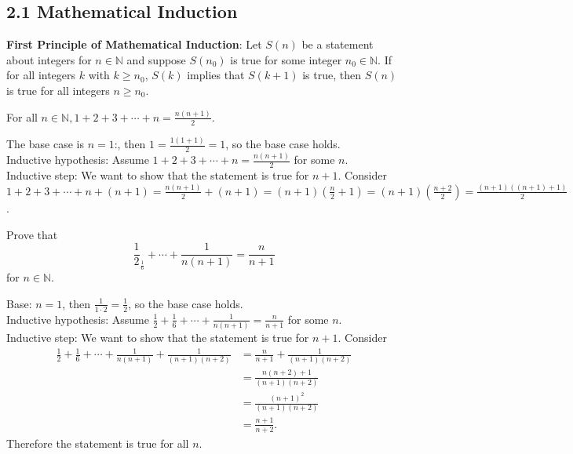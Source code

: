 \documentclass{article}
\newcommand{\N}{\mathbb{N}}
\begin{document}
\subsection{2.1 Mathematical Induction}
\begin{definition}
  \textbf{First Principle of Mathematical Induction}: Let $S(n)$ be a statement about integers for $n\in \N$ and suppose $S(n_0)$ is true for some integer $n_0\in\N$. If for all integers $k$ with $k\geq n_0$, $S(k)$ implies that $S(k+1)$ is true, then $S(n)$ is true for all integers $n\geq n_0$.
\end{definition}
\begin{example}
  For all $n\in\N,1+2+3+\cdots+n=\frac{n(n+1)}{2}$.

  The base case is $n=1$:, then $1=\frac{1(1+1)}{2}=1$, so the base case holds.\\
  Inductive hypothesis: Assume $1+2+3+\cdots+n=\frac{n(n+1)}{2}$ for some $n$.\\
  Inductive step: We want to show that the statement is true for $n+1$. Consider $1+2+3+\cdots+n+(n+1)=\frac{n(n+1)}{2}+(n+1)=(n+1)(\frac{n}{2}+1)=(n+1)(\frac{n+2}{2})=\frac{(n+1)((n+1)+1)}{2}$.
\end{example}
\begin{example}
  Prove that
  \[\frac{1}{2}_\frac{1}{6}+\cdots+\frac{1}{n(n+1)}=\frac{n}{n+1}\]
  for $n\in\N$.

  Base: $n=1$, then $\frac{1}{1\cdot 2}=\frac{1}{2}$, so the base case holds.\\
  Inductive hypothesis: Assume $\frac{1}{2}+\frac{1}{6}+\cdots+\frac{1}{n(n+1)}=\frac{n}{n+1}$ for some $n$.\\
  Inductive step: We want to show that the statement is true for $n+1$. Consider
  \begin{align*}
    \frac{1}{2}+\frac{1}{6}+\cdots+\frac{1}{n(n+1)}+\frac{1}{(n+1)(n+2)}&=\frac{n}{n+1}+\frac{1}{(n+1)(n+2)}\\&=\frac{n(n+2)+1}{(n+1)(n+2)}\\&=\frac{(n+1)^2}{(n+1)(n+2)}\\&=\frac{n+1}{n+2}.
  \end{align*}
  Therefore the statement is true for all $n$.
\end{example}
\end{document}
